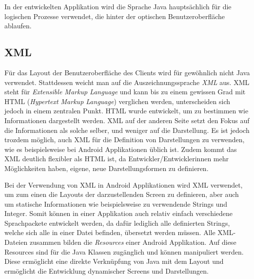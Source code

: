 \documentclass[../main.tex]{subfiles}
\begin{document}
	In der entwickelten Applikation wird die Sprache Java hauptsächlich für die logischen Prozesse verwendet, die hinter der optischen Benutzeroberfläche ablaufen.
	
	\subsection{XML}
	Für das Layout der Benutzeroberfläche des Clients wird für gewöhnlich nicht Java verwendet. Stattdessen weicht man auf die Auszeichnungssprache \emph{XML} aus. XML steht für \emph{Extensible Markup Language} und kann bis zu einem gewissen Grad mit HTML (\emph{Hypertext Markup Language}) verglichen werden, unterscheiden sich jedoch in einem zentralen Punkt. HTML wurde entwickelt, um zu bestimmen wie Informationen dargestellt werden. XML auf der anderen Seite setzt den Fokus auf die Informationen als solche selber, und weniger auf die Darstellung. Es ist jedoch trozdem möglich, auch XML für die Definition von Darstellungen zu verwenden, wie es beispielsweise bei Android Applikationen üblich ist. Zudem kommt das XML deutlich flexibler als HTML ist, da Entwickler/Entwicklerinnen mehr Möglichkeiten haben, eigene, neue Darstellungsformen zu definieren.
	
	Bei der Verwendung von XML in Android Applikationen wird XML verwendet, um zum einen die Layouts der darzustellenden Screen zu definieren, aber auch um statische Informationen wie beispielsweise zu verwendende Strings und Integer. Somit können in einer Applikation auch relativ einfach verschiedene Sprachpackete entwickelt werden, da dafür lediglich alle definierten Strings, welche sich alle in einer Datei befinden, übersetzt werden müssen. Alle XML-Dateien zusammen bilden die \emph{Resources} einer Android Applikation. Auf diese Resources sind für die Java Klassen zugänglich und können manipuliert werden. Diese ermöglicht eine direkte Verknüpfung von Java mit dem Layout und ermöglicht die Entwicklung dynamischer Screens und Darstellungen. \cite{xml} \cite{xmlW3}
	
\end{document}
